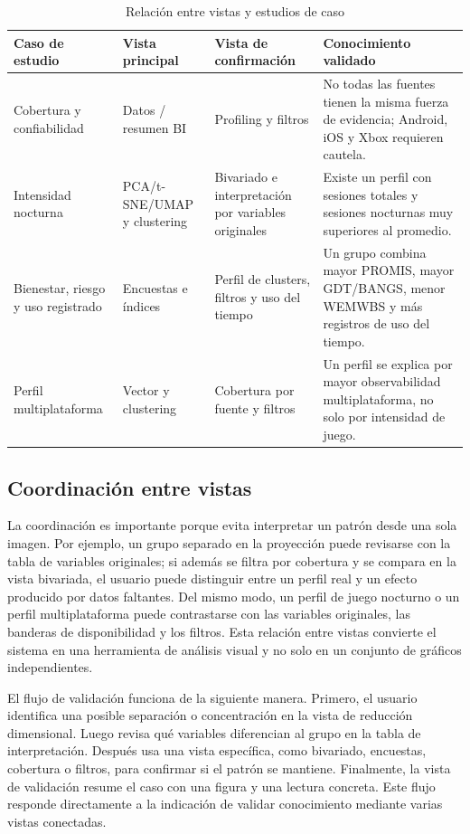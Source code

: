 \documentclass[12pt,a4paper]{article}
\begin{document}
\begin{table}[H]
\centering
\caption{Relaci\'on entre vistas y estudios de caso}
\begin{tabularx}{\textwidth}{p{3.2cm} p{4.2cm} p{4.2cm} X}
\toprule
\textbf{Caso de estudio} & \textbf{Vista principal} & \textbf{Vista de confirmaci\'on} & \textbf{Conocimiento validado} \\
\midrule
Cobertura y confiabilidad & Datos / resumen BI & Profiling y filtros & No todas las fuentes tienen la misma fuerza de evidencia; Android, iOS y Xbox requieren cautela. \\
Intensidad nocturna & PCA/t-SNE/UMAP y clustering & Bivariado e interpretaci\'on por variables originales & Existe un perfil con sesiones totales y sesiones nocturnas muy superiores al promedio. \\
Bienestar, riesgo y uso registrado & Encuestas e \'indices & Perfil de clusters, filtros y uso del tiempo & Un grupo combina mayor PROMIS, mayor GDT/BANGS, menor WEMWBS y m\'as registros de uso del tiempo. \\
Perfil multiplataforma & Vector y clustering & Cobertura por fuente y filtros & Un perfil se explica por mayor observabilidad multiplataforma, no solo por intensidad de juego. \\
\bottomrule
\end{tabularx}
\end{table}

\subsection{Coordinaci\'on entre vistas}

La coordinaci\'on es importante porque evita interpretar un patr\'on desde una sola imagen. Por ejemplo, un grupo separado en la proyecci\'on puede revisarse con la tabla de variables originales; si adem\'as se filtra por cobertura y se compara en la vista bivariada, el usuario puede distinguir entre un perfil real y un efecto producido por datos faltantes. Del mismo modo, un perfil de juego nocturno o un perfil multiplataforma puede contrastarse con las variables originales, las banderas de disponibilidad y los filtros. Esta relaci\'on entre vistas convierte el sistema en una herramienta de an\'alisis visual y no solo en un conjunto de gr\'aficos independientes.

El flujo de validaci\'on funciona de la siguiente manera. Primero, el usuario identifica una posible separaci\'on o concentraci\'on en la vista de reducci\'on dimensional. Luego revisa qu\'e variables diferencian al grupo en la tabla de interpretaci\'on. Despu\'es usa una vista espec\'ifica, como bivariado, encuestas, cobertura o filtros, para confirmar si el patr\'on se mantiene. Finalmente, la vista de validaci\'on resume el caso con una figura y una lectura concreta. Este flujo responde directamente a la indicaci\'on de validar conocimiento mediante varias vistas conectadas.
\end{document}
